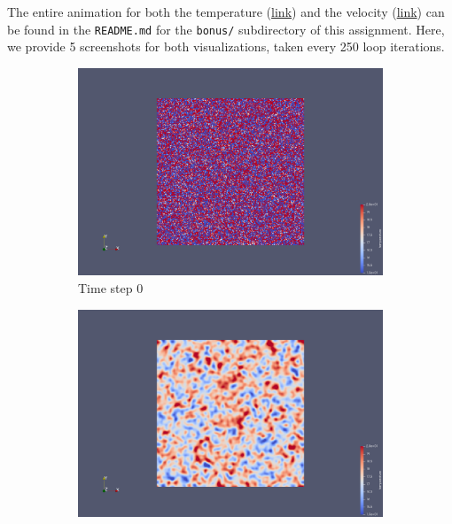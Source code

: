 \documentclass[a4paper,12pt]{article}
\begin{document}
The entire animation for both the temperature (\href{https://github.com/paulmyr/DD2358-HPC25/blob/master/04_parallel/bonus/README.md#temperature-visualization}{link}) and the velocity (\href{https://github.com/paulmyr/DD2358-HPC25/blob/master/04_parallel/bonus/README.md#velocity-visualization}{link}) can be found in the \verb|README.md| for the \verb|bonus/| subdirectory of this assignment.
Here, we provide 5 screenshots for both visualizations, taken every 250 loop iterations.

 \begin{figure}
\centering
\begin{subfigure}{0.4\textwidth}
    \includegraphics[width=\textwidth]{../images/vtk/bonus/temp/step_0.png}
    \caption{Time step 0}
\end{subfigure}
\hfill
\begin{subfigure}{0.4\textwidth}
    \includegraphics[width=\textwidth]{../images/vtk/bonus/temp/step_25.png}

\end{subfigure}
\end{figure}
\end{document}
